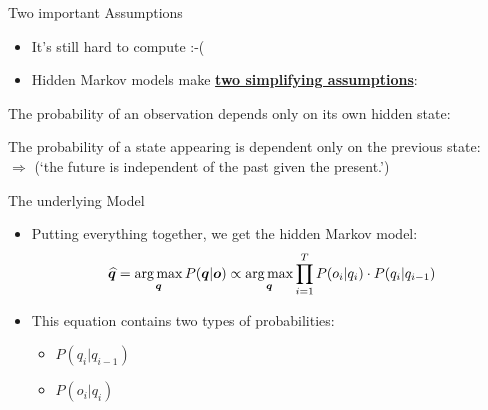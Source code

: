 \begin{frame}{Two important Assumptions}{}
	\begin{itemize}
		\item It's still hard to compute :-(
		\item Hidden Markov models make \textbf{\underline{two simplifying assumptions}}:
	\end{itemize}
	
	\footnotesize
	\begin{boxBlueNoFrame}
		 The probability of an observation depends only on its own hidden state:
	\end{boxBlueNoFrame}

	\begin{boxBlueNoFrame}
		 The probability of a state appearing is dependent only on the previous state:
			\highlight{$P(\bm{q}) \approx \prod_{1=1}^T P(q_i \vert q_{i-1})$} \\
			$\Rightarrow$  (`the future is independent of the past given the present.')
	\end{boxBlueNoFrame}
\end{frame}


\begin{frame}{The underlying Model}{}
	\begin{itemize}
		\item Putting everything together, we get the hidden Markov model:
		\begin{equation}
			\bm{\widehat{q}} = \operatorname*{arg\,max}_{\bm{q}} P(\bm{q} \vert \bm{o}) \propto
				\operatorname*{arg\,max}_{\bm{q}} \prod_{i=1}^T P(o_i \vert q_i) \cdot P(q_i \vert q_{i-1})
		\end{equation}
		\item This equation contains two types of probabilities:
		\begin{itemize}
			\item {} $P(q_i \vert q_{i-1})$
			\item {} $P(o_i \vert q_i)$
		\end{itemize}
	\end{itemize}
\end{frame}


